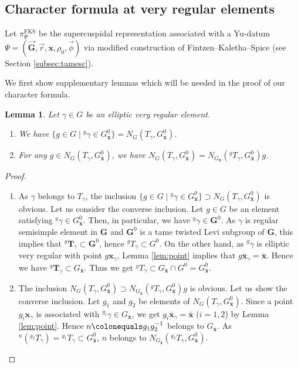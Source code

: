 \documentclass{amsart}
\newcommand{\FKS}{\mathrm{FKS}}
\newcommand{\bfT}{\mathbf{T}}
\newcommand{\x}{\mathbf{x}}
\newcommand{\bfG}{\mathbf{G}}
\theoremstyle{plain}
\newtheorem{lem}[thm]{Lemma}
\theoremstyle{definition}
\theoremstyle{remark}
\theoremstyle{theorem}
\begin{document}
\subsection{Character formula at very regular elements}\label{subsec:character}
Let $\pi^{\FKS}_{\Psi}$ be the supercuspidal representation associated with a Yu-datum $\Psi=(\vec{\bfG},\vec{r},\x,\rho_{0},\vec{\phi})$ via modified construction of Fintzen--Kaletha--Spice (see Section \ref{subsec:tamesc}).

We first show supplementary lemmas which will be needed in the proof of our character formula.

\begin{lem}\label{lem:Weyl}
Let $\gamma\in G$ be an elliptic very regular element.
\begin{enumerate}
\item
We have $\{g\in G \mid {}^{g}\gamma\in G^{0}_{\bar{\x}}\}=N_{G}(T_{\gamma},G^{0}_{\bar{\x}})$.
\item
For any $g\in N_{G}(T_{\gamma},G^{0}_{\bar{\x}})$, we have $N_{G}(T_{\gamma},G^{0}_{\bar{\x}})=N_{G_{\bar{\x}}}({}^{g}T_{\gamma},G^{0}_{\bar{\x}})g$.
\end{enumerate}
\end{lem}

\begin{proof}
\begin{enumerate}
\item
As $\gamma$ belongs to $T_{\gamma}$, the inclusion $\{g\in G \mid {}^{g}\gamma\in G^{0}_{\bar{\x}}\} \supset N_{G}(T_{\gamma},G^{0}_{\bar{\x}})$ is obvious.
Let us consider the converse inclusion.
Let $g\in G$ be an element satisfying ${}^{g}\gamma\in G^{0}_{\bar{\x}}$.
Then, in particular, we have ${}^{g}\gamma\in \bfG^{0}$.
As $\gamma$ is regular semisimple element in $\bfG$ and $\bfG^{0}$ is a tame twisted Levi subgroup of $\bfG$, this implies that ${}^{g}\bfT_{\gamma}\subset \bfG^{0}$, hence ${}^{g}T_{\gamma}\subset G^{0}$.
On the other hand, as ${}^{g}\gamma$ is elliptic very regular with point $g\x_{\gamma}$, Lemma \ref{lem:point} implies that $g\bar{\x}_{\gamma}=\bar{\x}$.
Hence we have ${}^{g}\bfT_{\gamma}\subset G_{\bar{\x}}$.
Thus we get ${}^{g}T_{\gamma}\subset G_{\bar{\x}}\cap G^{0}=G^{0}_{\bar{\x}}$.

\item
The inclusion $N_{G}(T_{\gamma},G^{0}_{\bar{\x}})\supset N_{G_{\bar{\x}}}({}^{g}T_{\gamma},G^{0}_{\bar{\x}})g$ is obvious.
Let us show the converse inclusion.
Let $g_{1}$ and $g_{2}$ be elements of $N_{G}(T_{\gamma},G^{0}_{\bar{\x}})$.
Since a point $g_{i}\x_{\gamma}$ is associated with ${}^{g_{i}}\gamma\in G_{\bar{\x}}$, we get $g_{i}\bar{\x}_{\gamma}=\bar{\x}$ ($i=1,2$) by Lemma \ref{lem:point}.
Hence $n\colonequals g_{1}g_{2}^{-1}$ belongs to $G_{\bar{\x}}$.
As ${}^{n}({}^{g_{2}}T_{\gamma})={}^{g_{1}}T_{\gamma}\subset G^{0}_{\bar{\x}}$, $n$ belongs to $N_{G_{\bar{\x}}}({}^{g_{2}}T_{\gamma},G^{0}_{\bar{\x}})$. \qedhere
\end{enumerate}
\end{proof}
\end{document}
